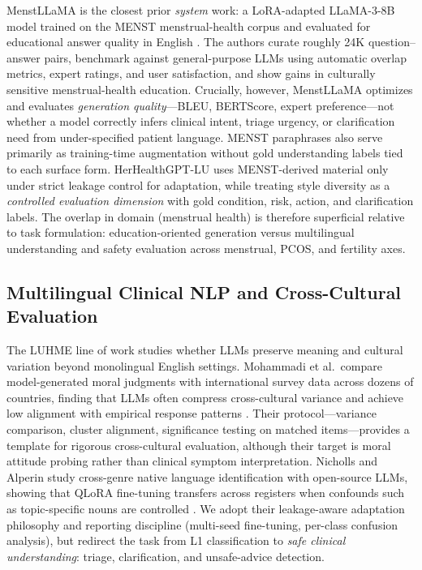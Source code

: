 MenstLLaMA is the closest prior \emph{system} work: a LoRA-adapted LLaMA-3-8B model trained on the MENST menstrual-health corpus and evaluated for educational answer quality in English \cite{adhikary-etal-2025-menstrual}.
The authors curate roughly 24K question--answer pairs, benchmark against general-purpose LLMs using automatic overlap metrics, expert ratings, and user satisfaction, and show gains in culturally sensitive menstrual-health education.
Crucially, however, MenstLLaMA optimizes and evaluates \emph{generation quality}---BLEU, BERTScore, expert preference---not whether a model correctly infers clinical intent, triage urgency, or clarification need from under-specified patient language.
MENST paraphrases also serve primarily as training-time augmentation without gold understanding labels tied to each surface form.
HerHealthGPT-LU uses MENST-derived material only under strict leakage control for adaptation, while treating style diversity as a \emph{controlled evaluation dimension} with gold condition, risk, action, and clarification labels.
The overlap in domain (menstrual health) is therefore superficial relative to task formulation: education-oriented generation versus multilingual understanding and safety evaluation across menstrual, PCOS, and fertility axes.

\subsection{Multilingual Clinical NLP and Cross-Cultural Evaluation}

The LUHME line of work studies whether LLMs preserve meaning and cultural variation beyond monolingual English settings.
Mohammadi et al.\ compare model-generated moral judgments with international survey data across dozens of countries, finding that LLMs often compress cross-cultural variance and achieve low alignment with empirical response patterns \cite{mohammadi-etal-2025-large}.
Their protocol---variance comparison, cluster alignment, significance testing on matched items---provides a template for rigorous cross-cultural evaluation, although their target is moral attitude probing rather than clinical symptom interpretation.
Nicholls and Alperin study cross-genre native language identification with open-source LLMs, showing that QLoRA fine-tuning transfers across registers when confounds such as topic-specific nouns are controlled \cite{nicholls-alperin-2025-cross}.
We adopt their leakage-aware adaptation philosophy and reporting discipline (multi-seed fine-tuning, per-class confusion analysis), but redirect the task from L1 classification to \emph{safe clinical understanding}: triage, clarification, and unsafe-advice detection.

